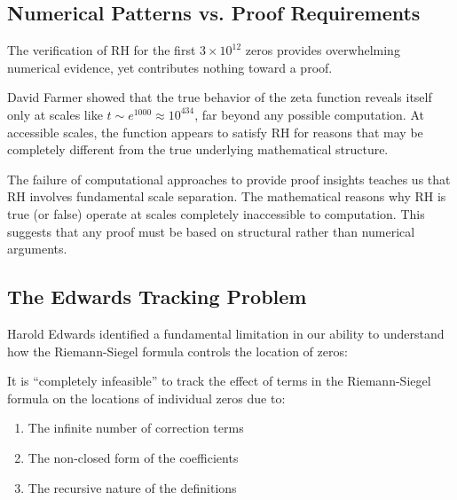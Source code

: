 \subsection{Numerical Patterns vs. Proof Requirements}
\label{subsec:numerical_vs_proof}

The verification of RH for the first $3 \times 10^{12}$ zeros provides overwhelming numerical evidence, yet contributes nothing toward a proof.

\begin{example}
David Farmer showed that the true behavior of the zeta function reveals itself only at scales like $t \sim e^{1000} \approx 10^{434}$, far beyond any possible computation. At accessible scales, the function appears to satisfy RH for reasons that may be completely different from the true underlying mathematical structure.
\end{example}

\begin{lesson}
The failure of computational approaches to provide proof insights teaches us that RH involves fundamental scale separation. The mathematical reasons why RH is true (or false) operate at scales completely inaccessible to computation. This suggests that any proof must be based on structural rather than numerical arguments.
\end{lesson}

\subsection{The Edwards Tracking Problem}
\label{subsec:edwards_tracking}

Harold Edwards identified a fundamental limitation in our ability to understand how the Riemann-Siegel formula controls the location of zeros:

\begin{theorem}
It is ``completely infeasible'' to track the effect of terms in the Riemann-Siegel formula on the locations of individual zeros due to:
\begin{enumerate}
\item The infinite number of correction terms
\item The non-closed form of the coefficients
\item The recursive nature of the definitions
\end{enumerate}
\end{theorem}

